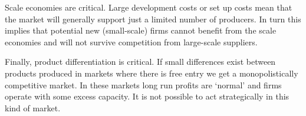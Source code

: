 Scale economies are critical. Large development costs or set up costs mean that the market will generally support just a limited number of producers. In turn this implies that potential new (small-scale) firms cannot benefit from the scale economies and will not survive competition from large-scale suppliers. 

Finally, product differentiation is critical. If small differences exist between products produced in markets where there is free entry we get a monopolistically competitive market. In these markets long run profits are `normal' and firms operate with some excess capacity. It is not possible to act strategically in this kind of market.
